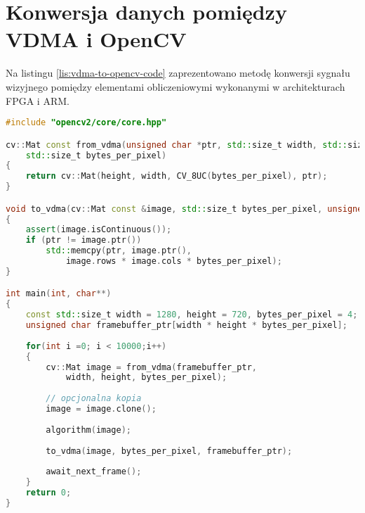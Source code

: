 \section{Konwersja danych pomiędzy VDMA i OpenCV}
\label{sec:vdma-to-opencv}

Na listingu \ref{lis:vdma-to-opencv-code} zaprezentowano metodę konwersji sygnału wizyjnego pomiędzy elementami obliczeniowymi wykonanymi w architekturach FPGA i ARM.


\begin{lstlisting}[language=C++, label=lis:vdma-to-opencv-code, caption=Konwersja sygnału wizyjnego pomiędzy AXI VDMA i \texttt{cv::Mat}.]
#include "opencv2/core/core.hpp"

cv::Mat const from_vdma(unsigned char *ptr, std::size_t width, std::size_t height,
	std::size_t bytes_per_pixel)
{
	return cv::Mat(height, width, CV_8UC(bytes_per_pixel), ptr);
}

void to_vdma(cv::Mat const &image, std::size_t bytes_per_pixel, unsigned char *ptr)
{
	assert(image.isContinuous());
	if (ptr != image.ptr())
		std::memcpy(ptr, image.ptr(),
			image.rows * image.cols * bytes_per_pixel);
}

int main(int, char**)
{
	const std::size_t width = 1280, height = 720, bytes_per_pixel = 4;
	unsigned char framebuffer_ptr[width * height * bytes_per_pixel];
	
	for(int i =0; i < 10000;i++)
	{
		cv::Mat image = from_vdma(framebuffer_ptr,
			width, height, bytes_per_pixel);
		
		// opcjonalna kopia
		image = image.clone();
		
		algorithm(image);
		
		to_vdma(image, bytes_per_pixel, framebuffer_ptr);
		
		await_next_frame();
	}
	return 0;
}

\end{lstlisting}